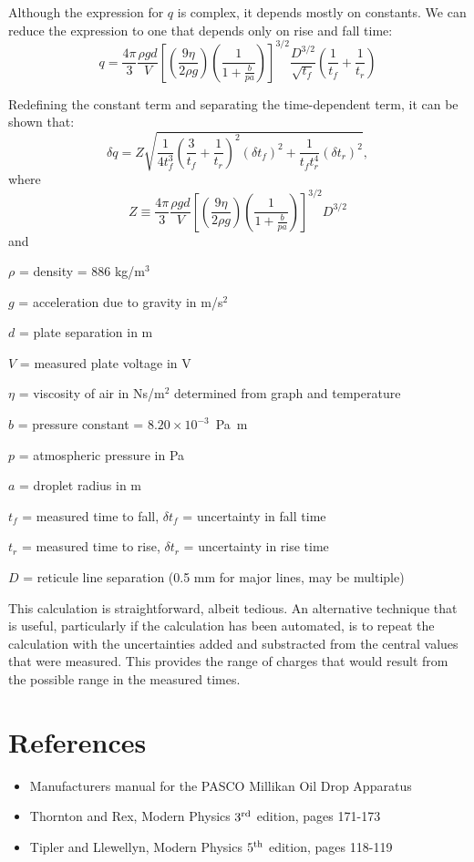 Although the expression for $q$ is complex, it depends mostly on constants. We
can reduce the expression to one that depends only on rise and fall time:
\begin{equation}
q = \frac{4\pi}{3} \frac{\rho g d}{V} \left[ \left(\frac{9\eta}{2\rho g}\right)
  \left(\frac{1}{1 + \frac{b}{p a}}\right) \right]^{3/2} \frac{D^{3/2}}{\sqrt{t_f}}
\left(\frac{1}{t_f} + \frac{1}{t_r} \right)
\end{equation}

Redefining the constant term and separating the time-dependent term, it can be
shown that:
\begin{equation}
\delta q = Z \sqrt{ \frac{1}{4t_f^3} \left( \frac{3}{t_f} +
  \frac{1}{t_r}\right)^2 (\delta t_f)^2 + \frac{1}{t_f t_r^4} (\delta t_r)^2 },
\end{equation}
\noindent where 
\begin{equation}
Z \equiv \frac{4\pi}{3} \frac{\rho g d}{V} \left[ \left(\frac{9\eta}{2\rho g}\right)
  \left(\frac{1}{1 + \frac{b}{p a}}\right) \right]^{3/2} D^{3/2}
\end{equation}
\noindent and
\begin{itemize*}
\item $\rho$ = density = 886 kg/m$^3$
\item $g$ = acceleration due to gravity in m/s$^2$
\item $d$ = plate separation in m
\item $V$ = measured plate voltage in V
\item $\eta$ = viscosity of air in Ns/m$^2$ determined from graph and
  temperature 
\item $b$ = pressure constant = $8.20\times10^{-3}$~Pa~m
\item $p$ = atmospheric pressure in Pa
\item $a$ = droplet radius in m
\item $t_f$ = measured time to fall, $\delta t_f$ = uncertainty in fall time
\item $t_r$ = measured time to rise, $\delta t_r$ = uncertainty in rise time
\item $D$ = reticule line separation (0.5 mm for major lines, may be multiple)
\end{itemize*}

This calculation is straightforward, albeit tedious.  An alternative technique that is useful, particularly if the calculation has been automated, is to repeat the calculation with the uncertainties added and substracted from the central values that were measured.  This provides the range of charges that would result from the possible range in the measured times.


\section{References}

\begin{itemize}
\item Manufacturers manual for the PASCO Millikan Oil Drop Apparatus
\item Thornton and Rex, Modern Physics $3^{\rm rd}$ edition, pages 171-173
\item Tipler and Llewellyn, Modern Physics $5^{\rm th}$ edition, pages 118-119
\end{itemize}

